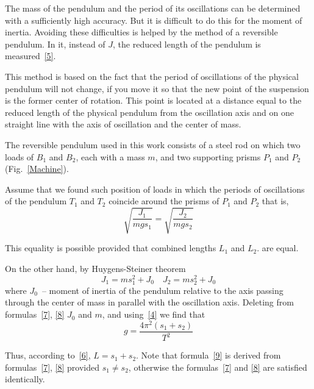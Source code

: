 \documentclass{LabWorkEng}
\begin{document}
The mass of the pendulum and the period of its oscillations can be determined with a sufficiently high accuracy. But it is difficult to do this for the moment of inertia. Avoiding these difficulties is helped by the method of a reversible pendulum. In it, instead of $J$, the reduced length of the pendulum is measured~\eqref{5}.

This method is based on the fact that the period of oscillations of the physical pendulum will not change, if you move it so that the new point of the suspension is the former center of rotation. This point is located at a distance equal to the reduced length of the physical pendulum from the oscillation axis and on one straight line with the axis of oscillation and the center of mass.

The reversible pendulum used in this work consists of a steel rod on which two loads of $B_1$ and $B_2$, each with a mass $m$, and two supporting prisms $P_1$ and $P_2$ (Fig.~\ref{Machine}).

Assume that we found such position of loads in which the periods of oscillations of the pendulum $T_1$ and $T_2$ coincide around the prisms of $P_1$ and $P_2$ that is,
\begin{equation}\label{7}
	\sqrt{\frac{{{J_1}}}{{mg{s_1}}}}  = \sqrt {\frac{{{J_2}}}{{mg{s_2}}}}
\end{equation}

This equality is possible provided that combined lengths $L_1$ and $L_2$. are equal.

On the other hand, by Huygens-Steiner theorem
\begin{equation}\label{8}
	J_1 = ms_1^2 + J_0\quad J_2 = ms_2^2 + J_0
\end{equation}
where $J_0$~-- moment of inertia of the pendulum relative to the axis passing through the center of mass in parallel with the oscillation axis. Deleting from formulas~\eqref{7}, \eqref{8} $J_0$ and $m$, and using~\eqref{4} we find that
\begin{equation}\label{9}
	g = \frac{{4{\pi ^2}\left( {{s_1} + {s_2}} \right)}}{{{T^2}}}
\end{equation}

Thus, according to~\eqref{6},  $L  = s_1 + s_2$.  Note that formula~\eqref{9} is derived from formulas~\eqref{7}, \eqref{8} provided $s_1 \neq s_2$, otherwise the formulas~\eqref{7} and \eqref{8}  are satisfied identically.
\end{document}
